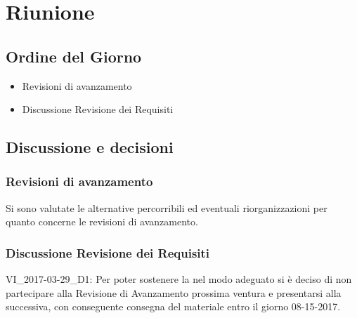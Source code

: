 \section{Riunione}
\subsection{Ordine del Giorno}
\begin{itemize}
	\item Revisioni di avanzamento
	\item Discussione Revisione dei Requisiti
\end{itemize}

\subsection{Discussione e decisioni}

\subsubsection{Revisioni di avanzamento}
Si sono valutate le alternative percorribili ed eventuali riorganizzazioni per quanto concerne le revisioni di avanzamento.

\subsubsection{Discussione Revisione dei Requisiti}
VI\_2017-03-29\_D1: Per poter sostenere la \RQ{} nel modo adeguato si è deciso di non partecipare alla Revisione di Avanzamento prossima ventura e presentarsi alla successiva, con conseguente consegna del materiale entro il giorno 08-15-2017.

\clearpage
